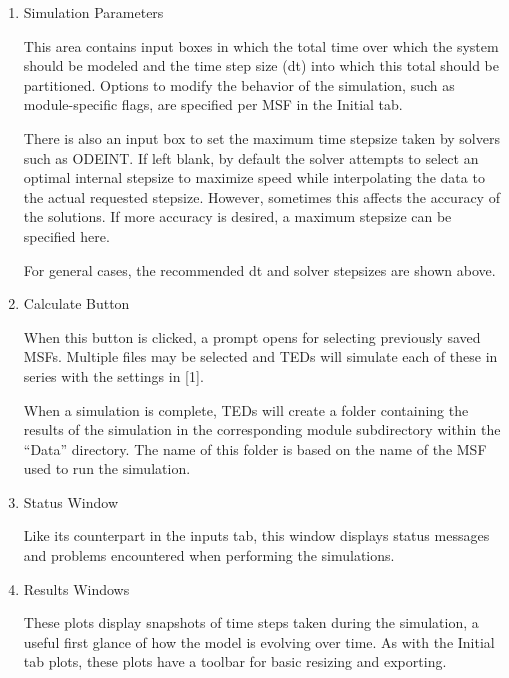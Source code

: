 \documentclass[11pt,letterpaper,titlepage]{article}
\begin{document}
	\begin{enumerate}
		\item Simulation Parameters
		
		\par This area contains input boxes in which the total time over which the system should be modeled and the time step size (dt) into which this total should be partitioned. Options to modify the behavior of the simulation, such as  module-specific flags, are specified per MSF in the Initial tab.
		
		\par There is also an input box to set the maximum time stepsize taken by solvers such as ODEINT. If left blank, by default the solver attempts to select an optimal internal stepsize to maximize speed while interpolating the data to the actual requested stepsize. However, sometimes this affects the accuracy of the solutions. If more accuracy is desired, a maximum stepsize can be specified here.
		
		\par For general cases, the recommended dt and solver stepsizes are shown above.
		
		\item Calculate Button
		\par When this button is clicked, a prompt opens for selecting previously saved MSFs. Multiple files may be selected and TEDs will simulate each of these in series with the settings in [1].
		
		\par When a simulation is complete, TEDs will create a folder  containing the results of the simulation in the corresponding module subdirectory within the “Data” directory. The name of this folder is based on the name of the MSF used to run the simulation.
		
		\item Status Window
		\par Like its counterpart in the inputs tab, this window displays status messages and problems encountered when performing the simulations.
		
		\item Results Windows
		\par These plots display snapshots of time steps taken during the simulation, a useful first glance of how the model is evolving over time. As with the Initial tab plots, these plots have a toolbar for basic resizing and exporting. 
		
	\end{enumerate}
\end{document}
